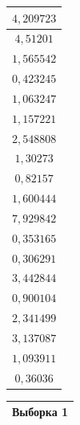 \begin{table}[h]
\begin{minipage}[h]{0.49\linewidth}
\begin{center}
\begin{tabular}{|c|}
          $4{,}209723$ \\
          \hline 
        
          $4{,}51201$ \\
          \hline 
        
          $1{,}565542$ \\
          \hline 
        
          $0{,}423245$ \\
          \hline 
        
          $1{,}063247$ \\
          \hline 
        
          $1{,}157221$ \\
          \hline 
        
          $2{,}548808$ \\
          \hline 
        
          $1{,}30273$ \\
          \hline 
        
          $0{,}82157$ \\
          \hline 
        
          $1{,}600444$ \\
          \hline 
        
          $7{,}929842$ \\
          \hline 
        
          $0{,}353165$ \\
          \hline 
        
          $0{,}306291$ \\
          \hline 
        
          $3{,}442844$ \\
          \hline 
        
          $0{,}900104$ \\
          \hline 
        
          $2{,}341499$ \\
          \hline 
        
          $3{,}137087$ \\
          \hline 
        
          $1{,}093911$ \\
          \hline 
        
          $0{,}36036$ \\
          \hline 
        
      \end{tabular}
    \end{center}
  \end{minipage}
  \hfill
  \begin{minipage}[h]{0.49\linewidth}
    \begin{center}
      \begin{tabular}{|c|}
        \hline
        Выборка 1 \\
        \hline 
        

\end{tabular}
\end{center}
\end{minipage}
\end{table}
